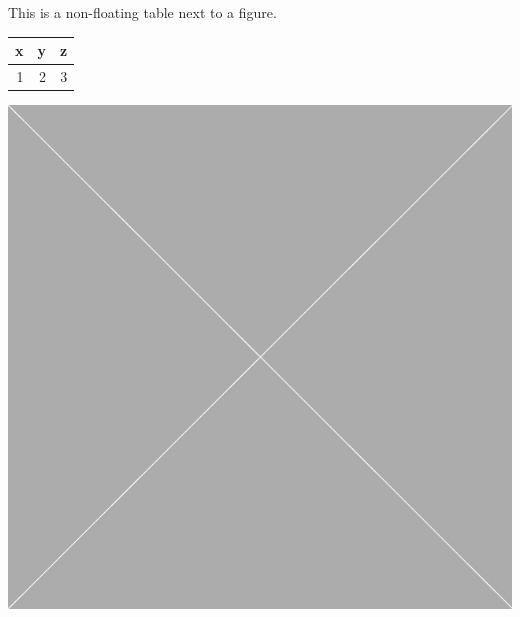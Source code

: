 \documentclass[10pt,oneside]{book}
\begin{document}
\noindent
\begin{minipage}{\textwidth}
  This is a non-floating table next to a figure.

\flushleft
\begin{minipage}{.48\linewidth}
  \centering
  \begin{tabular}{rrr}
    \toprule
    x & y & z \\
    \midrule
    1 & 2 & 3 \\
    \bottomrule
  \end{tabular}
  \label{tab:tableexample3}
\end{minipage}
\quad
\begin{minipage}{.48\linewidth}
  \centering
  \includegraphics[width=1.0\linewidth]{Pictures/placeholder.jpg}
  \label{fig:graph1}
\end{minipage}%
\end{minipage}
\end{document}
